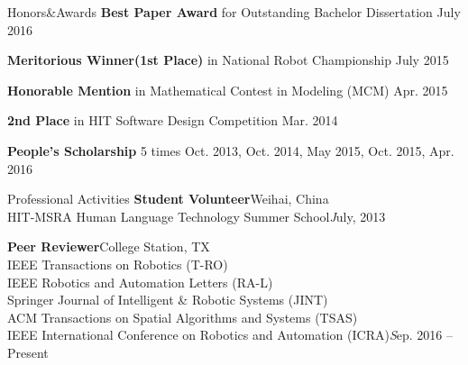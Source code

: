 \documentclass{resume} %
\begin{document}
\begin{rSection}{Honors\&Awards}
{\bf Best Paper Award}{ for Outstanding Bachelor Dissertation} \hfill {July 2016}
\vspace*{-0.4em}

{\bf Meritorious Winner(1st Place)}{ in National Robot Championship} \hfill {July 2015}
\vspace*{-0.4em}

{\bf Honorable Mention}{ in Mathematical Contest in Modeling (MCM)} \hfill {Apr. 2015}
\vspace*{-0.4em}

{\bf 2nd Place}{ in HIT Software Design Competition} \hfill {Mar. 2014} 
\vspace*{-0.4em}

{\bf People's Scholarship} 5 times \hfill {Oct. 2013, Oct. 2014, May 2015, Oct. 2015, Apr. 2016}
\vspace*{-0.4em}

\end{rSection}

\begin{rSection}{Professional Activities}
{\bf Student Volunteer}\hfill Weihai, China\\
HIT-MSRA Human Language Technology Summer School\hfill {\emph July, 2013}
\vspace*{-0.2em}

{\bf Peer Reviewer}\hfill College Station, TX\\
IEEE Transactions on Robotics (T-RO)\\
IEEE Robotics and Automation Letters (RA-L)\\
Springer Journal of Intelligent \& Robotic Systems (JINT)\\
ACM Transactions on Spatial Algorithms and Systems (TSAS)\\
IEEE International Conference on Robotics and Automation (ICRA)\hfill {\emph Sep. 2016 -- Present}
\end{rSection}
\end{document}
